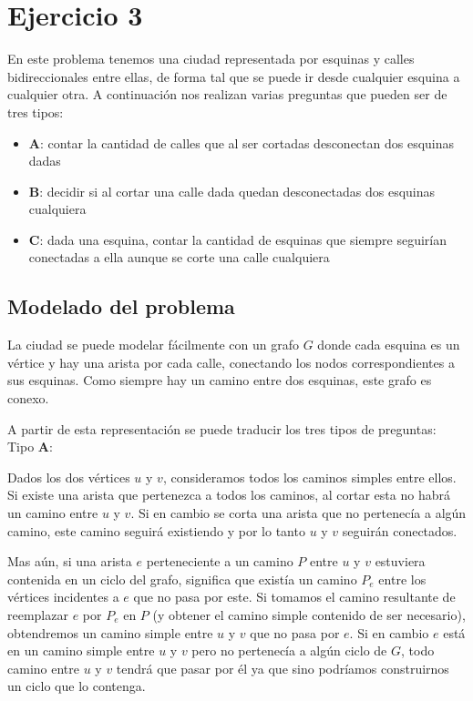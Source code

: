 \section{Ejercicio 3}

En este problema tenemos una ciudad representada por esquinas y calles bidireccionales entre ellas, de forma tal que se puede ir desde cualquier esquina a cualquier otra. A continuación nos realizan varias preguntas que pueden ser de tres tipos:

\begin{itemize}

    \item \textbf{A}: contar la cantidad de calles que al ser cortadas desconectan dos esquinas dadas
    \item \textbf{B}: decidir si al cortar una calle dada quedan desconectadas dos esquinas cualquiera
    \item \textbf{C}: dada una esquina, contar la cantidad de esquinas que siempre seguirían conectadas a ella aunque se corte una calle cualquiera

\end{itemize}

\subsection{Modelado del problema}

La ciudad se puede modelar fácilmente con un grafo $G$ donde cada esquina es un vértice y hay una arista por cada calle, conectando los nodos correspondientes a sus esquinas. Como siempre hay un camino entre dos esquinas, este grafo es conexo.

A partir de esta representación se puede traducir los tres tipos de preguntas:
\\

\noindent Tipo \textbf{A}:

Dados los dos vértices $u$ y $v$, consideramos todos los caminos simples entre ellos.
Si existe una arista que pertenezca a todos los caminos, al cortar esta no habrá un camino entre $u$ y $v$.
Si en cambio se corta una arista que no pertenecía a algún camino, este camino seguirá existiendo y por lo
tanto $u$ y $v$ seguirán conectados.

Mas aún, si una arista $e$ perteneciente a un camino $P$ entre $u$ y $v$ estuviera contenida en un ciclo del grafo, significa que existía un camino $P_e$ entre los vértices incidentes a $e$ que no pasa por este. Si tomamos el camino resultante de reemplazar $e$ por $P_e$ en $P$ (y obtener el camino simple contenido de ser necesario), obtendremos un camino simple entre $u$ y $v$ que no pasa por $e$. Si en cambio $e$ está en un camino simple entre $u$ y $v$ pero no pertenecía a algún ciclo de $G$, todo camino entre $u$ y $v$ tendrá que pasar por él ya que sino podríamos construirnos un ciclo que lo contenga.

